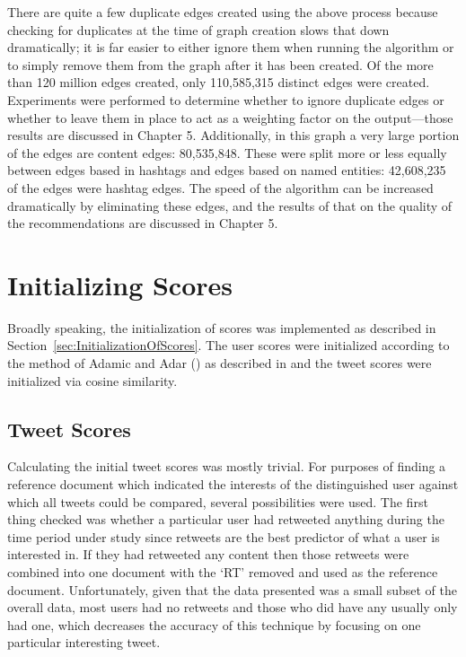There are quite a few duplicate edges created using the above process because checking for duplicates at the time of graph creation slows that down dramatically; it is far easier to either ignore them when running the algorithm or to simply remove them from the graph after it has been created. Of the more than 120 million edges created, only  110,585,315 distinct edges were created. Experiments were performed to determine whether to ignore duplicate edges or whether to leave them in place to act as a weighting factor on the output---those results are discussed in Chapter 5. Additionally, in this graph a very large portion of the edges are content edges: 80,535,848. These were split more or less equally between edges based in hashtags and edges based on named entities:  42,608,235 of the edges were hashtag edges. The speed of the algorithm can be increased dramatically by eliminating these edges, and the results of that on the quality of the recommendations are discussed in Chapter 5.


\section{Initializing Scores}
\label{sec:InitializingScores}

Broadly speaking, the initialization of scores was implemented as described in Section~\ref{sec:InitializationOfScores}. The user scores were initialized according to the method of Adamic and Adar (\cite{Adamic2003}) as described in \cite{LibenNowell2007} and the tweet scores were initialized via cosine similarity.

\subsection{Tweet Scores}
\label{sec:TweetScoresImplementation}

Calculating the initial tweet scores was mostly trivial. For purposes of finding a reference document which indicated the interests of the distinguished user against which all tweets could be compared, several possibilities were used. The first thing checked was whether a particular user had retweeted anything during the time period under study since retweets are the best predictor of what a user is interested in. If they had retweeted any content then those retweets were combined into one document with the `RT' removed and used as the reference document. Unfortunately, given that the data presented was a small subset of the overall data, most users had no retweets and those who did have any usually only had one, which decreases the accuracy of this technique by focusing on one particular interesting tweet.

